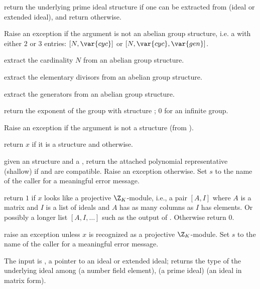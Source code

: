  return the underlying prime ideal structure
if one can be extracted from  (ideal or extended ideal), and
return  otherwise.

 Raise an exception if the argument
is not an abelian group structure, i.e. a  with either $2$ or $3$
entries: $[N,\var{cyc}]$ or $[N,\var{cyc}, \var{gen}]$.

 extract the cardinality $N$ from an abelian group structure.

 extract the elementary divisors  from an abelian group structure.

 extract the generators  from an abelian group structure.

 return the exponent of the group with structure ; $0$ for an infinite
group.

 Raise an exception if the argument is not a
 structure (from ).

 return $x$ if it is a  structure
and  otherwise.

 given an 
structure  and a  , return the attached
polynomial representative (shallow) if  and  are compatible.
Raise an exception otherwise. Set $s$ to the name of the caller for a
meaningful error message.

 return $1$ if $x$ looks like
a projective $\Z_K$-module, i.e., a pair $[A,I]$ where $A$ is a matrix and
$I$ is a list of ideals and $A$ has as many columns as $I$ has elements. Or
possibly a longer list $[A,I,\dots]$ such as the output of
. Otherwise return $0$.

 raise an exception
unless $x$ is recognized as a projective $\Z_K$-module. Set $s$ to the name
of the caller for a meaningful error message.

 The input is , a pointer
to an ideal or extended ideal; returns the type of the underlying ideal
among  (a number field element),  (a prime
ideal)  (an ideal in matrix form).

